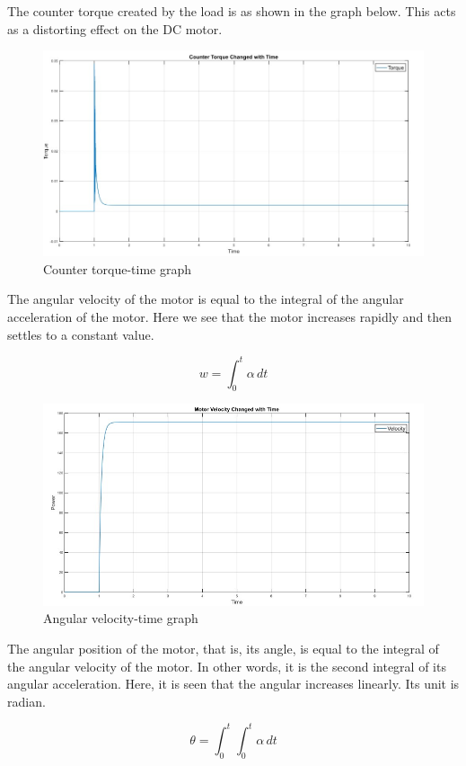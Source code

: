 The counter torque created by the load is as shown in the graph below. This acts as a
distorting effect on the DC motor.

\begin{figure}[H]
    \centering
    \includegraphics[width=0.7\columnwidth]{imgs/io/c.jpg}
    \caption[Counter torque-time graph]{Counter torque-time graph}
    \label{fig-magnitude}
\end{figure}%

The angular velocity of the motor is equal to the integral of the angular acceleration of the
motor. Here we see that the motor increases rapidly and then settles to a constant value.

\begin{equation}
w = \int_0^t \alpha \, dt    
\end{equation}

\begin{figure}[H]
    \centering
    \includegraphics[width=0.7\columnwidth]{imgs/io/d.jpg}
    \caption[Angular velocity-time graph]{Angular velocity-time graph}
    \label{fig-magnitude}
\end{figure}%

The angular position of the motor, that is, its angle, is equal to the integral of the angular velocity
of the motor. In other words, it is the second integral of its angular acceleration. Here, it is seen
that the angular increases linearly. Its unit is radian.

\begin{equation}
\theta = \int_{0}^{t} \int_{0}^{t} \alpha \, dt    
\end{equation}

